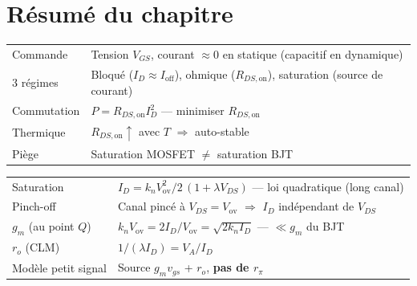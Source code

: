 \documentclass[12pt,a4paper,twoside]{book}
\begin{document}
\section*{Résumé du chapitre}

\begin{bases}[title={\color{white} Résumé --- Les Bases}]
\begin{center}
\renewcommand{\arraystretch}{1.3}
\begin{tabular}{p{3.5cm}p{9.5cm}}
\toprule
Commande & Tension $V_{GS}$, courant $\approx 0$ en statique (capacitif en dynamique) \\
3 régimes & Bloqué ($I_D \approx I_{\text{off}}$), ohmique ($R_{DS,\text{on}}$), saturation (source de courant) \\
Commutation & $P = R_{DS,\text{on}} I_D^2$ --- minimiser $R_{DS,\text{on}}$ \\
Thermique & $R_{DS,\text{on}} \uparrow$ avec $T$ $\Rightarrow$ auto-stable \\
Piège & Saturation MOSFET $\neq$ saturation BJT \\
\bottomrule
\end{tabular}
\end{center}
\end{bases}

\begin{approfondissement}[title={\color{white} Résumé --- Approfondissement}]
\begin{center}
\renewcommand{\arraystretch}{1.3}
\begin{tabular}{p{3.5cm}p{9.5cm}}
\toprule
Saturation & $I_D = k_n V_{\text{ov}}^2/2\,(1+\lambda V_{DS})$ --- loi quadratique (long canal) \\
Pinch-off & Canal pincé à $V_{DS} = V_{\text{ov}}$ $\Rightarrow$ $I_D$ indépendant de $V_{DS}$ \\
$g_m$ (au point $Q$) & $k_n V_{\text{ov}} = 2I_D/V_{\text{ov}} = \sqrt{2k_n I_D}$ --- $\ll g_m$ du BJT \\
$r_o$ (CLM) & $1/(\lambda I_D) = V_A/I_D$ \\
Modèle petit signal & Source $g_m v_{gs}$ + $r_o$, \textbf{pas de $r_\pi$} \\
\bottomrule
\end{tabular}
\end{center}
\end{approfondissement}
\end{document}
